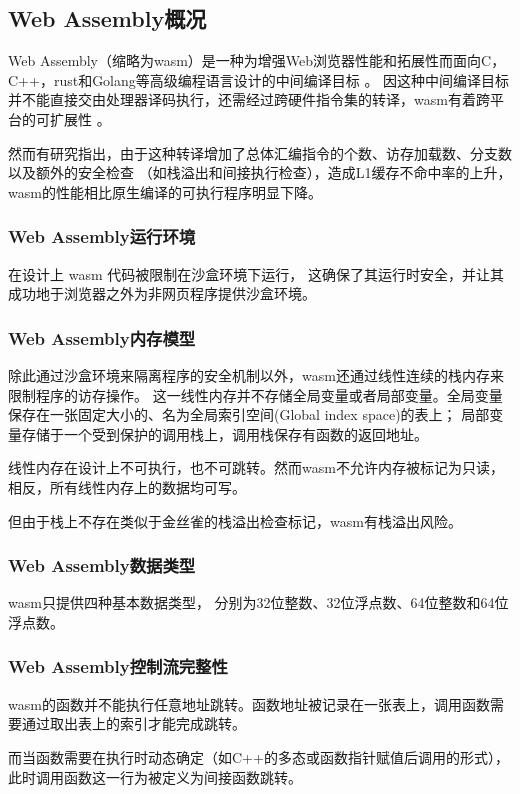 \subsection{Web Assembly概况}
Web Assembly（缩略为wasm）是一种为增强Web浏览器性能和拓展性而面向C，C++，rust和Golang等高级编程语言设计的中间编译目标
\cite{wasmCommunityGroup, lehmannWasabiFrameworkDynamically2019, lehmannEverythingOldNew, bhansaliFirstLookCode2022, waseemIssuesTheirCauses2024}。\nolinebreak
因这种中间编译目标并不能直接交由处理器译码执行，还需经过跨硬件指令集的转译，wasm有着跨平台的可扩展性
\cite{lehmannEverythingOldNew, waseemIssuesTheirCauses2024, lehmannWasabiFrameworkDynamically2019, JayProvablySafe}。

然而有研究\cite{JangdaNotsoFast}指出，由于这种转译增加了总体汇编指令的个数、访存加载数、分支数以及额外的安全检查
（如栈溢出和间接执行检查），造成L1缓存不命中率的上升，wasm的性能相比原生编译的可执行程序明显下降。

\subsubsection{Web Assembly运行环境}
在设计上 wasm 代码被限制在沙盒环境下运行\cite{johnsonWaVeVerifiablySecure2023,WasmbpfStreamliningEBPF2024}，
这确保了其运行时安全，并让其成功地于浏览器之外为非网页程序提供沙盒环境\cite{narayanSwivelHardeningWebAssembly, WebAssemblySummaryOnSecurity, 9156135}。

\subsubsection{Web Assembly内存模型}
除此通过沙盒环境来隔离程序的安全机制以外，wasm还通过线性连续的栈内存来限制程序的访存操作。
这一线性内存并不存储全局变量或者局部变量。全局变量保存在一张固定大小的、名为全局索引空间(Global index space)的表上；
局部变量存储于一个受到保护的调用栈上，调用栈保存有函数的返回地址。

线性内存在设计上不可执行，也不可跳转。然而wasm不允许内存被标记为只读，
相反，所有线性内存上的数据均可写\cite{lehmannEverythingOldNew}。

但由于栈上不存在类似于金丝雀的栈溢出检查标记，wasm有栈溢出风险。
\subsubsection{Web Assembly数据类型}
wasm只提供四种基本数据类型\cite{wasmCommunityGroup,lehmannEverythingOldNew}，
分别为32位整数、32位浮点数、64位整数和64位浮点数。
\subsubsection{Web Assembly控制流完整性}
wasm的函数并不能执行任意地址跳转。函数地址被记录在一张表上，调用函数需要通过取出表上的索引才能完成跳转。

而当函数需要在执行时动态确定（如C++的多态或函数指针赋值后调用的形式），
此时调用函数这一行为被定义为间接函数跳转\cite{Daniel2019DiscoveringVI}。